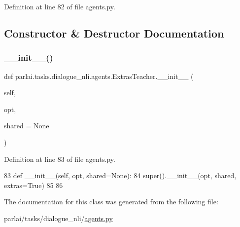 Definition at line 82 of file agents.\+py.



\subsection{Constructor \& Destructor Documentation}
\mbox{\label{classparlai_1_1tasks_1_1dialogue__nli_1_1agents_1_1ExtrasTeacher_a5713e0c8aa5f0dc996004e7028c7725b}} 
\subsubsection{\texorpdfstring{\+\_\+\+\_\+init\+\_\+\+\_\+()}{\_\_init\_\_()}}
{\footnotesize\ttfamily def parlai.\+tasks.\+dialogue\+\_\+nli.\+agents.\+Extras\+Teacher.\+\_\+\+\_\+init\+\_\+\+\_\+ (\begin{DoxyParamCaption}\item[{}]{self,  }\item[{}]{opt,  }\item[{}]{shared = {\ttfamily None} }\end{DoxyParamCaption})}



Definition at line 83 of file agents.\+py.


\begin{DoxyCode}
83     \textcolor{keyword}{def }\_\_init\_\_(self, opt, shared=None):
84         super().\_\_init\_\_(opt, shared, extras=\textcolor{keyword}{True})
85 
86 
\end{DoxyCode}


The documentation for this class was generated from the following file\+:\begin{DoxyCompactItemize}
\item 
parlai/tasks/dialogue\+\_\+nli/\hyperlink{parlai_2tasks_2dialogue__nli_2agents_8py}{agents.\+py}\end{DoxyCompactItemize}

